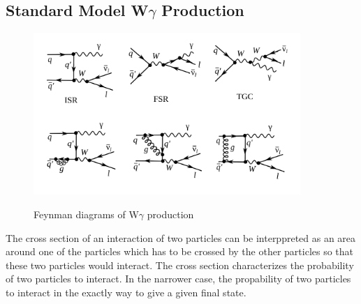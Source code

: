 \subsection{Standard Model W$\gamma$ Production}

\begin{figure}[htb]
  \begin{center}
    {\includegraphics[width=0.90\textwidth]{../figs/WgAbout/feynmWg_LO_NLO.png}}
    \caption{Feynman diagrams of W$\gamma$ production}
    \label{fig:feynmWg_LO_NLO}
  \end{center}
\end{figure}



The cross section of an interaction of two particles can be interppreted as an area around one of the particles which has to be crossed by the other particles so that these two particles would interact. The cross section characterizes the probability of two particles to interact. In the narrower case, the propability of two particles to interact in the exactly way to give a given final state.\\

